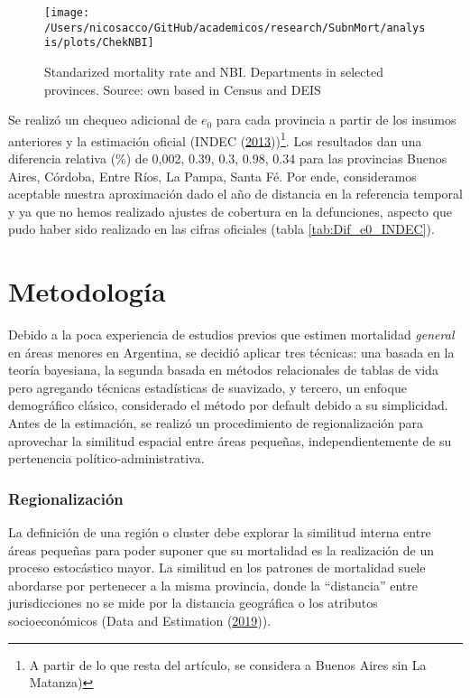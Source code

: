 \documentclass[12pt,]{article}
\begin{document}
\begin{figure}

{\centering \texttt{[image: /Users/nicosacco/GitHub/academicos/research/SubnMort/analysis/plots/ChekNBI]} 

}

\caption{Standarized mortality rate and NBI. Departments in selected provinces. Source: own based in Census and DEIS}\label{fig:NBI}
\end{figure}

Se realizó un chequeo adicional de \(e_0\) para cada provincia a partir
de los insumos anteriores y la estimación oficial (INDEC
(\protect\hyperlink{ref-INDEC2013}{2013}))\footnote{A partir de lo que
  resta del artículo, se considera a Buenos Aires sin La Matanza)}. Los
resultados dan una diferencia relativa (\%) de 0,002, 0.39, 0.3, 0.98,
0.34 para las provincias Buenos Aires, Córdoba, Entre Ríos, La Pampa,
Santa Fé. Por ende, consideramos aceptable nuestra aproximación dado el
año de distancia en la referencia temporal y ya que no hemos realizado
ajustes de cobertura en la defunciones, aspecto que pudo haber sido
realizado en las cifras oficiales (tabla \ref{tab:Dif_e0_INDEC}).

\hypertarget{metodologuxeda}{%
\section{\texorpdfstring{\textbf{Metodología}}{Metodología}}\label{metodologuxeda}}

Debido a la poca experiencia de estudios previos que estimen mortalidad
\emph{general} en áreas menores en Argentina, se decidió aplicar tres
técnicas: una basada en la teoría bayesiana, la segunda basada en
métodos relacionales de tablas de vida pero agregando técnicas
estadísticas de suavizado, y tercero, un enfoque demográfico clásico,
considerado el método por default debido a su simplicidad. Antes de la
estimación, se realizó un procedimiento de regionalización para
aprovechar la similitud espacial entre áreas pequeñas,
independientemente de su pertenencia político-administrativa.

\hypertarget{regionalizaciuxf3n}{%
\subsubsection{\texorpdfstring{\textbf{Regionalización}}{Regionalización}}\label{regionalizaciuxf3n}}

La definición de una región o cluster debe explorar la similitud interna
entre áreas pequeñas para poder suponer que su mortalidad es la
realización de un proceso estocástico mayor. La similitud en los
patrones de mortalidad suele abordarse por pertenecer a la misma
provincia, donde la ``distancia'' entre jurisdicciones no se mide por la
distancia geográfica o los atributos socioeconómicos (Data and
Estimation (\protect\hyperlink{ref-Longford2005}{2019})).
\end{document}
